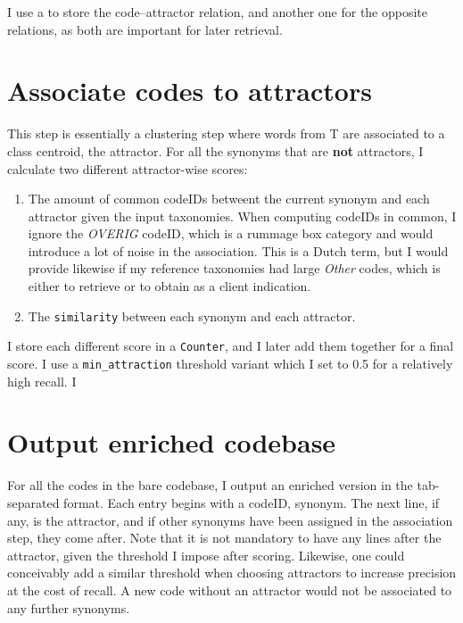 \documentclass[12pt]{article}%
\begin{document}
\begin{enumerate}
I use a  to store the code--attractor relation, and another one for the opposite relations, as both are important for later retrieval.

\end{enumerate}

\section{Associate codes to attractors}
This step is essentially a clustering step where words from T are associated to a class centroid, the attractor. For all the synonyms that are \textbf{not} attractors, I calculate two different attractor-wise scores:
\begin{enumerate}
\item The amount of common codeIDs betweent the current synonym and each attractor given the input taxonomies. When computing codeIDs in common, I ignore the \textit{OVERIG} codeID, which is a rummage box category and would introduce a lot of noise in the association. This is a Dutch term, but I would provide likewise if my reference taxonomies had large \textit{Other} codes, which is either to retrieve or to obtain as a client indication.
\item The \texttt{similarity} between each synonym and each attractor.
\end{enumerate}

I store each different score in a \texttt{Counter}, and I later add them together for a final score. I use a \texttt{min\_attraction} threshold variant which I set to 0.5 for a relatively high recall. I 

\section{Output enriched codebase}
For all the codes in the bare codebase, I output an enriched version in the tab-separated format. Each entry begins with a codeID, synonym. The next line, if any, is the attractor, and if other synonyms have been assigned in the association step, they come after. Note that it is not mandatory to have any lines after the attractor, given the threshold I impose after scoring. Likewise, one could conceivably add a similar threshold when choosing attractors to increase precision at the cost of recall. A new code without an attractor would not be associated to any further synonyms.







%
%
%
\end{document}
